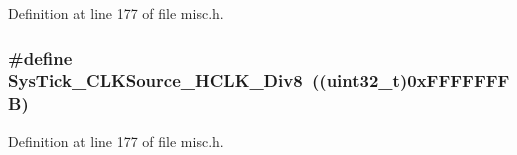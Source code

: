 Definition at line 177 of file misc.\+h.

\subsubsection[{\texorpdfstring{Sys\+Tick\+\_\+\+C\+L\+K\+Source\+\_\+\+H\+C\+L\+K\+\_\+\+Div8}{SysTick_CLKSource_HCLK_Div8}}]{\setlength{\rightskip}{0pt plus 5cm}\#define Sys\+Tick\+\_\+\+C\+L\+K\+Source\+\_\+\+H\+C\+L\+K\+\_\+\+Div8~(({\bf uint32\+\_\+t})0x\+F\+F\+F\+F\+F\+F\+F\+B)}\hypertarget{group___sys_tick__clock__source_ga545c387ce43db90f15faad5f354f890d}{}\label{group___sys_tick__clock__source_ga545c387ce43db90f15faad5f354f890d}


Definition at line 177 of file misc.\+h.

